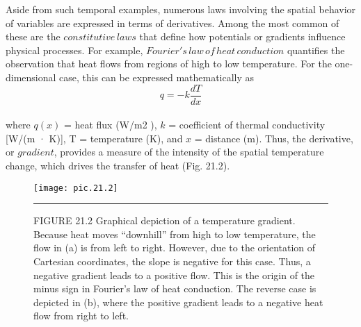 \documentclass[../main.tex]{subfiles}
\begin{document}
Aside from such temporal examples, numerous laws involving the spatial behavior of
variables are expressed in terms of derivatives. Among the most common of these are the
$constitutive \, laws$ that define how potentials or gradients influence physical processes. For
example, $Fourier's \, law \, of \, heat \, conduction$ quantifies the observation that heat flows from
regions of high to low temperature. For the one-dimensional case, this can be expressed
mathematically as
\begin{equation}
	\tag{21.11}
	q = -k \dfrac{dT}{dx}
\end{equation}\\
where $q (x)$ = heat flux (W/m2
), $k$ = coefficient of thermal conductivity [W/(m · K)], T =
temperature (K), and $x$ = distance (m). Thus, the derivative, or $gradient$, provides a measure
of the intensity of the spatial temperature change, which drives the transfer of heat (Fig. 21.2).
\pagebreak
\begin{figure}[hbt!]
	\centering
	\texttt{[image: pic.21.2]}
	\caption{\textsf{FIGURE 21.2
Graphical depiction of a temperature gradient. Because heat moves “downhill” from high to low
temperature, the flow in (a) is from left to right. However, due to the orientation of Cartesian
coordinates, the slope is negative for this case. Thus, a negative gradient leads to a positive
flow. This is the origin of the minus sign in Fourier's law of heat conduction. The reverse case is
depicted in (b), where the positive gradient leads to a negative heat flow from right to left.}} \hrule
	\label{pic.21.2}
\end{figure}\\
\end{document}
